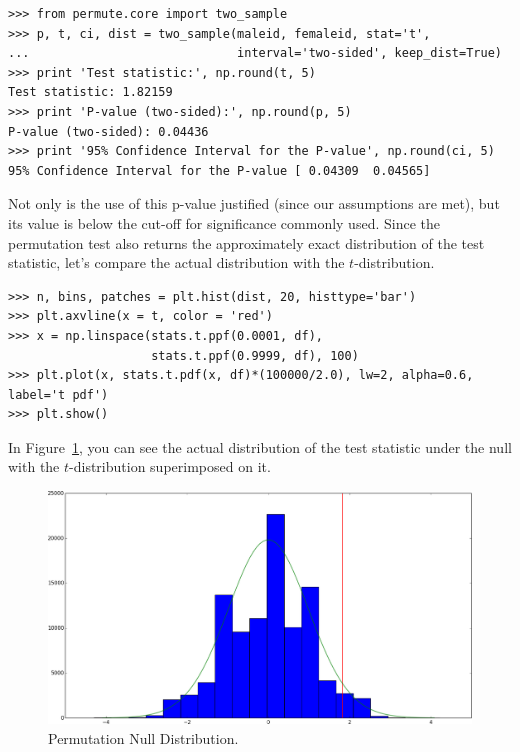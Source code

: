\begin{verbatim}
>>> from permute.core import two_sample
>>> p, t, ci, dist = two_sample(maleid, femaleid, stat='t',
...                             interval='two-sided', keep_dist=True)
>>> print 'Test statistic:', np.round(t, 5)
Test statistic: 1.82159
>>> print 'P-value (two-sided):', np.round(p, 5)
P-value (two-sided): 0.04436
>>> print '95% Confidence Interval for the P-value', np.round(ci, 5)
95% Confidence Interval for the P-value [ 0.04309  0.04565]
\end{verbatim}

Not only is the use of this p-value justified (since our assumptions are
met), but its value is below the cut-off for significance commonly used.
Since the permutation test also returns the approximately exact distribution
of the test statistic, let's compare the actual distribution with the
$t$-distribution.

\begin{verbatim}
>>> n, bins, patches = plt.hist(dist, 20, histtype='bar')
>>> plt.axvline(x = t, color = 'red')
>>> x = np.linspace(stats.t.ppf(0.0001, df),
                    stats.t.ppf(0.9999, df), 100)
>>> plt.plot(x, stats.t.pdf(x, df)*(100000/2.0), lw=2, alpha=0.6, label='t pdf')
>>> plt.show()
\end{verbatim}

In Figure~\ref{fig:figure1}, you can see the actual distribution of the test
statistic under the null with the $t$-distribution superimposed on it.

\begin{figure}
  \begin{centering}
    \includegraphics[width=.8\textwidth]{fig/figure_1.png}\par
  \end{centering}

  \caption{\label{fig:figure1}Permutation Null Distribution.}

\end{figure}

